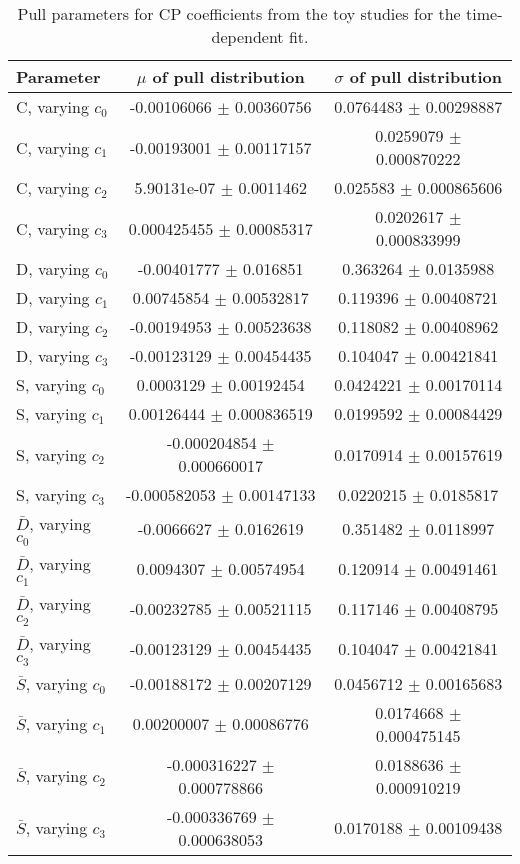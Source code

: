 \begin{table}[hp!]
\centering
\caption{Pull parameters for CP coefficients from the toy studies for the time-dependent fit.}
\begin{tabular}{l | c | c}
\hline
Parameter & $\mu$ of pull distribution & $\sigma$ of pull distribution \\
\hline
\hline
C, varying $c_{0}$ & -0.00106066 $\pm$ 0.00360756 & 0.0764483 $\pm$ 0.00298887 \\
C, varying $c_{1}$ & -0.00193001 $\pm$ 0.00117157 & 0.0259079 $\pm$ 0.000870222 \\
C, varying $c_{2}$ & 5.90131e-07 $\pm$ 0.0011462 & 0.025583 $\pm$ 0.000865606 \\
C, varying $c_{3}$ & 0.000425455 $\pm$ 0.00085317 & 0.0202617 $\pm$ 0.000833999 \\
\hline
D, varying $c_{0}$ & -0.00401777 $\pm$ 0.016851 & 0.363264 $\pm$ 0.0135988 \\
D, varying $c_{1}$ & 0.00745854 $\pm$ 0.00532817 & 0.119396 $\pm$ 0.00408721 \\
D, varying $c_{2}$ & -0.00194953 $\pm$ 0.00523638 & 0.118082 $\pm$ 0.00408962 \\
D, varying $c_{3}$ & -0.00123129 $\pm$ 0.00454435 & 0.104047 $\pm$ 0.00421841 \\
\hline
S, varying $c_{0}$ & 0.0003129 $\pm$ 0.00192454 & 0.0424221 $\pm$ 0.00170114 \\
S, varying $c_{1}$ & 0.00126444 $\pm$ 0.000836519 & 0.0199592 $\pm$ 0.00084429 \\
S, varying $c_{2}$ & -0.000204854 $\pm$ 0.000660017 & 0.0170914 $\pm$ 0.00157619 \\
S, varying $c_{3}$ & -0.000582053 $\pm$ 0.00147133 & 0.0220215 $\pm$ 0.0185817 \\
\hline
$\bar{D}$, varying $c_{0}$ & -0.0066627 $\pm$ 0.0162619 & 0.351482 $\pm$ 0.0118997 \\
$\bar{D}$, varying $c_{1}$ & 0.0094307 $\pm$ 0.00574954 & 0.120914 $\pm$ 0.00491461 \\
$\bar{D}$, varying $c_{2}$ & -0.00232785 $\pm$ 0.00521115 & 0.117146 $\pm$ 0.00408795 \\
$\bar{D}$, varying $c_{3}$ & -0.00123129 $\pm$ 0.00454435 & 0.104047 $\pm$ 0.00421841 \\
\hline
$\bar{S}$, varying $c_{0}$ & -0.00188172 $\pm$ 0.00207129 & 0.0456712 $\pm$ 0.00165683 \\
$\bar{S}$, varying $c_{1}$ & 0.00200007 $\pm$ 0.00086776 & 0.0174668 $\pm$ 0.000475145 \\
$\bar{S}$, varying $c_{2}$ & -0.000316227 $\pm$ 0.000778866 & 0.0188636 $\pm$ 0.000910219 \\
$\bar{S}$, varying $c_{3}$ & -0.000336769 $\pm$ 0.000638053 & 0.0170188 $\pm$ 0.00109438 \\
\hline
\end{tabular}
\label{table:Pulls_tDFit}
\end{table}
